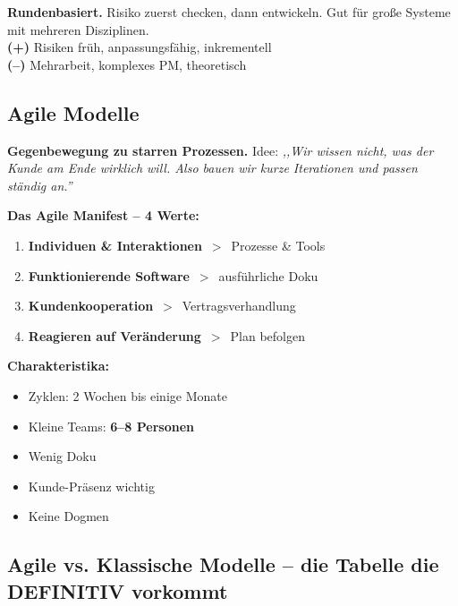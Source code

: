\documentclass[11pt,a4paper]{article}
\begin{document}
\begin{keyfacts}
\textbf{Rundenbasiert.} Risiko zuerst checken, dann entwickeln. Gut für große Systeme mit mehreren Disziplinen.\\
\textbf{(+)} Risiken früh, anpassungsfähig, inkrementell\\
\textbf{(--)} Mehrarbeit, komplexes PM, theoretisch
\end{keyfacts}

\subsection{Agile Modelle}

\begin{story}
\textbf{Gegenbewegung zu starren Prozessen.} Idee: \emph{,,Wir wissen nicht, was der Kunde am Ende wirklich will. Also bauen wir kurze Iterationen und passen ständig an.''}
\end{story}

\begin{keyfacts}
\textbf{Das Agile Manifest -- 4 Werte:}
\begin{enumerate}
  \item \textbf{Individuen \& Interaktionen} \,$>$\, Prozesse \& Tools
  \item \textbf{Funktionierende Software} \,$>$\, ausführliche Doku
  \item \textbf{Kundenkooperation} \,$>$\, Vertragsverhandlung
  \item \textbf{Reagieren auf Veränderung} \,$>$\, Plan befolgen
\end{enumerate}

\textbf{Charakteristika:}
\begin{itemize}
  \item Zyklen: 2 Wochen bis einige Monate
  \item Kleine Teams: \textbf{6--8 Personen}
  \item Wenig Doku
  \item Kunde-Präsenz wichtig
  \item Keine Dogmen
\end{itemize}
\end{keyfacts}

\subsection{Agile vs. Klassische Modelle -- die Tabelle die DEFINITIV vorkommt}
\end{document}
